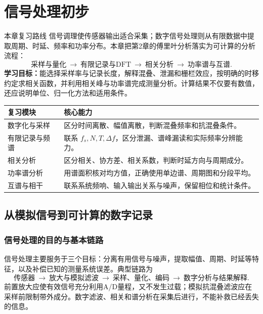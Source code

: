 \chapter{信号处理初步}
\label{chap:signal-processing}

\begin{focusbox}{本章复习路线}
信号调理使传感器输出适合采集；数字信号处理则从有限数据中提取周期、时延、频率和功率分布。本章把第2章的傅里叶分析落实为可计算的分析流程：
\[
\text{采样与量化}\ \longrightarrow\ \text{有限记录与DFT}
\ \longrightarrow\ \text{相关分析}\ \longrightarrow\ \text{功率谱与互谱}.
\]
\textbf{学习目标：}能选择采样率与记录长度，解释混叠、泄漏和栅栏效应，按明确的时移约定求相关函数，并利用相关峰与功率谱完成测量分析。计算结果不仅要有数值，还应说明单位、归一化方法和适用条件。
\end{focusbox}

\begin{table}[H]
\centering\small
\begin{tabularx}{\linewidth}{@{}p{3cm} X@{}}
\toprule
复习模块 & 核心能力 \\
\midrule
数字化与采样 & 区分时间离散、幅值离散，判断混叠频率和抗混叠条件。 \\
有限记录与频谱 & 联系 $f_s,N,T,\Delta f$，区分泄漏、谱峰漏读和实际频率分辨能力。 \\
相关分析 & 区分相关、协方差、相关系数，判断时延方向与周期成分。 \\
功率谱分析 & 用谱面积核对均方值，正确使用单边谱、周期图和分段平均。 \\
互谱与相干 & 联系系统频响、输入输出关系与噪声，保留相位和统计条件。 \\
\bottomrule
\end{tabularx}
\end{table}

\section{从模拟信号到可计算的数字记录}

\subsection{信号处理的目的与基本链路}
信号处理主要服务于三个目标：分离有用信号与噪声，提取幅值、周期、时延等特征，以及补偿已知的测量系统误差。典型链路为
\[
\text{传感器}\ \longrightarrow\ \text{放大与模拟滤波}
\ \longrightarrow\ \text{采样、量化、编码}
\ \longrightarrow\ \text{数字分析与结果解释}.
\]
前置放大应使有效信号充分利用A/D量程，又不发生过载；模拟抗混叠滤波应在采样前限制带外成分。数字滤波、相关和谱分析在采集后进行，不能补救已经丢失的信息。

